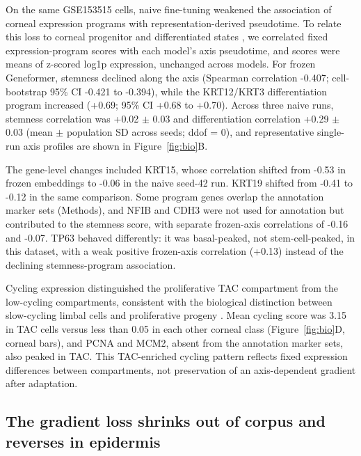 \documentclass[12pt,letterpaper]{article}
\begin{document}
On the same GSE153515 cells, naive fine-tuning weakened the association of corneal expression programs with representation-derived pseudotime. To relate this loss to corneal progenitor and differentiated states \cite{collin2021,ligocki2021}, we correlated fixed expression-program scores with each model's axis pseudotime, and scores were means of z-scored log1p expression, unchanged across models. For frozen Geneformer, stemness declined along the axis (Spearman correlation -0.407; cell-bootstrap 95\% CI -0.421 to -0.394), while the KRT12/KRT3 differentiation program increased (+0.69; 95\% CI +0.68 to +0.70). Across three naive runs, stemness correlation was +0.02 $\pm$ 0.03 and differentiation correlation +0.29 $\pm$ 0.03 (mean $\pm$ population SD across seeds; ddof = 0), and representative single-run axis profiles are shown in Figure~\ref{fig:bio}B.

The gene-level changes included KRT15, whose correlation shifted from -0.53 in frozen embeddings to -0.06 in the naive seed-42 run. KRT19 shifted from -0.41 to -0.12 in the same comparison. Some program genes overlap the annotation marker sets (Methods), and NFIB and CDH3 were not used for annotation but contributed to the stemness score, with separate frozen-axis correlations of -0.16 and -0.07. TP63 behaved differently: it was basal-peaked, not stem-cell-peaked, in this dataset, with a weak positive frozen-axis correlation (+0.13) instead of the declining stemness-program association.

Cycling expression distinguished the proliferative TAC compartment from the low-cycling compartments, consistent with the biological distinction between slow-cycling limbal cells and proliferative progeny \cite{cotsarelis1989}. Mean cycling score was 3.15 in TAC cells versus less than 0.05 in each other corneal class (Figure~\ref{fig:bio}D, corneal bars), and PCNA and MCM2, absent from the annotation marker sets, also peaked in TAC. This TAC-enriched cycling pattern reflects fixed expression differences between compartments, not preservation of an axis-dependent gradient after adaptation.

\subsection*{The gradient loss shrinks out of corpus and reverses in epidermis}
\end{document}
